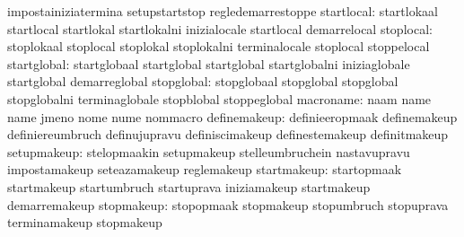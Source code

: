                                   impostainiziatermina             setupstartstop
                                  regledemarrestoppe
                      startlocal: startlokaal                      startlocal
                                  startlokal                       startlokalni
                                  inizialocale                     startlocal
                                  demarrelocal
                       stoplocal: stoplokaal                       stoplocal
                                  stoplokal                        stoplokalni
                                  terminalocale                    stoplocal
                                  stoppelocal
                     startglobal: startglobaal                     startglobal
                                  startglobal                      startglobalni
                                  iniziaglobale                    startglobal
                                  demarreglobal
                      stopglobal: stopglobaal                      stopglobal
                                  stopglobal                       stopglobalni
                                  terminaglobale                   stopblobal
                                  stoppeglobal
                       macroname: naam                             name
                                  name                             jmeno
                                  nome                             nume
                                  nommacro
                    definemakeup: definieeropmaak                  definemakeup
                                  definiereumbruch                 definujupravu
                                  definiscimakeup                  definestemakeup
                                  definitmakeup
                     setupmakeup: stelopmaakin                     setupmakeup
                                  stelleumbruchein                 nastavupravu
                                  impostamakeup                    seteazamakeup
                                  reglemakeup
                     startmakeup: startopmaak                      startmakeup
                                  startumbruch                     startuprava
                                  iniziamakeup                     startmakeup
                                  demarremakeup
                      stopmakeup: stopopmaak                       stopmakeup
                                  stopumbruch                      stopuprava
                                  terminamakeup                    stopmakeup
